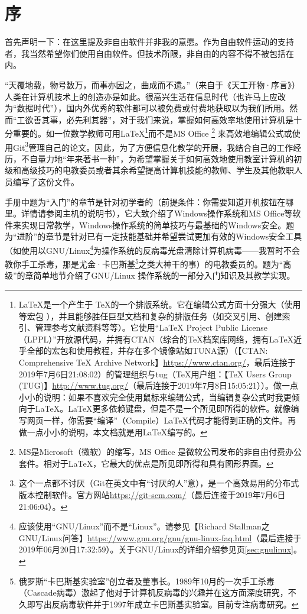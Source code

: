 \documentclass{book}
\begin{document}
\section{序}
首先声明一下：在这里提及非自由软件并非我的意愿。作为自由软件运动的支持者，我当然希望你们使用自由软件。但技术所限，非自由的内容不得不被包括在内。\par
“天覆地载，物号数万，而事亦因之，曲成而不遗。”（来自于《天工开物·序言》）人类在计算机技术上的创造亦是如此。很高兴生活在信息时代（也许马上应改为“数据时代”），国内外优秀的软件都可以被免费或付费地获取以为我们所用。然而“工欲善其事，必先利其器”，对于我们来说，掌握如何高效率地使用计算机是十分重要的。如一位数学教师可用\LaTeX\footnote{\LaTeX 是一个产生于 \TeX 的一个排版系统。它在编辑公式方面十分强大（使用 \AmSTeX 等宏包 ），并且能够胜任巨型文档和复杂的排版任务（如交叉引用、创建索引、管理参考文献资料等等）。它使用“LaTeX Project Public Li­cense （LPPL）”开放源代码，并拥有CTAN（综合的TeX档案库网络，拥有\LaTeX 近乎全部的宏包和使用教程，并存在多个镜像站如TUNA源）（【CTAN: Comprehensive TeX Archive Network】\url{https://www.ctan.org/}，最后连接于2019年7月6日21:08:02）的管理组织与tug（\TeX 用户组：【TeX Users Group (TUG)】\url{http://www.tug.org/}（最后连接于2019年7月8日15:05:21））。做一点小小的说明：如果不喜欢完全使用鼠标来编辑公式，当编辑复杂公式时我更倾向于\LaTeX。\LaTeX 更多依赖键盘，但是不是一个所见即所得的软件。就像编写网页一样，你需要“编译”（Compile）\LaTeX 代码才能得到正确的文件。再做一点小小的说明，本文档就是用\LaTeX 编写的。}而不是MS Office \footnote{MS是Microsoft（微软）的缩写，MS Office 是微软公司发布的非自由付费办公套件。相对于\LaTeX ，它最大的优点是所见即所得和具有图形界面。} 来高效地编辑公式或使用Git\footnote{这个一点都不讨厌（Git在英文中有“讨厌的人”意），是一个高效易用的分布式版本控制软件。官方网站\url{https://git-scm.com/}（最后连接于2019年7月6日21:06:04）。}管理自己的论文。因此，为了方便信息化教学的开展，我结合自己的工作经历，不自量力地“年来著书一种”，为希望掌握关于如何高效地使用教室计算机的初级和高级技巧的电教委员或者其余希望提高计算机技能的教师、学生及其他教职人员编写了这份文件。\par
手册中题为“入门”的章节是针对初学者的（前提条件：你需要知道开机按钮在哪里。详情请参阅主机的说明书），它大致介绍了Windows操作系统和MS Office等软件来实现日常教学，Windows操作系统的简单技巧与最基础的Windows安全。题为“进阶”的章节是针对已有一定技能基础并希望尝试更加有效的Windows安全工具（如使用以GNU/Linux\footnote{应该使用“GNU/Linux”而不是“Linux”。请参见【Richard Stallman之GNU/Linux问答】\url{https://www.gnu.org/gnu/gnu-linux-faq.html}（最后连接于2019年06月20日17:32:59）。关于GNU/Linux的详细介绍参见\pageref{sec:gnulinux}页\ref{sec:gnulinux}。}为操作系统的反病毒光盘清除计算机病毒——我暂时不会教你手工杀毒，那是尤金·卡巴斯基\footnote{俄罗斯“卡巴斯基实验室”创立者及董事长。1989年10月的一次手工杀毒（Cascade病毒）激起了他对于计算机反病毒的兴趣并在这方面深度研究，不久即写出反病毒软件并于1997年成立卡巴斯基实验室。目前专注病毒研究。}之类大神干的事）的电教委员的。题为“高级”的章简单地节介绍了GNU/Linux 操作系统的一部分入门知识及其教学实现。\par
\end{document}
